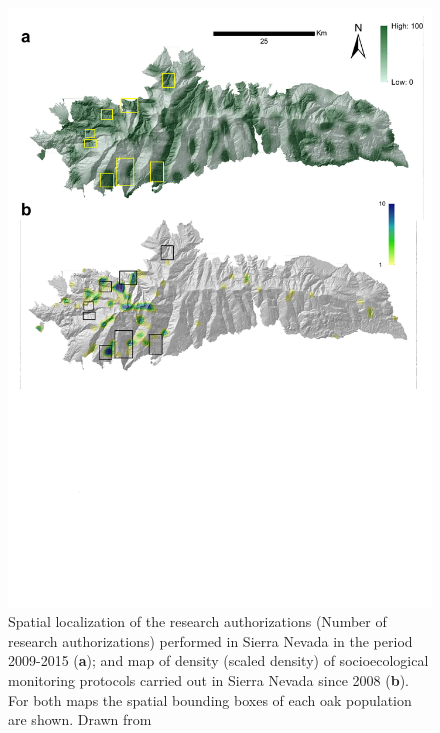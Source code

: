 \begin{figure}
    \centering
    \includegraphics[width=\textwidth]{img/es/es-scientific.pdf}
    \caption{Spatial localization of the research authorizations (Number of research authorizations) performed in Sierra Nevada in the period 2009-2015 (\textbf{a}); and map of density (scaled density) of socioecological monitoring protocols carried out in Sierra Nevada since 2008 (\textbf{b}). For both maps the spatial bounding boxes of each oak population are shown. Drawn from \autocites{Zamoraetal2017MonitoringGlobal,Zamoraetal2016GlobalChange}}\label{fig:es:scientific}
\end{figure}

